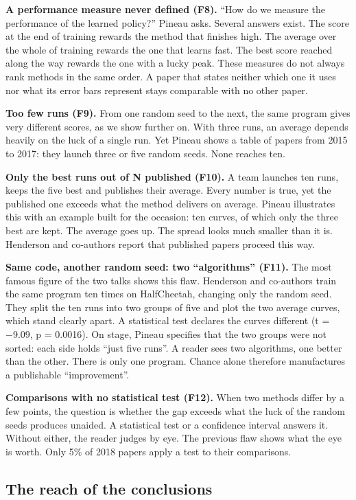 \documentclass[11pt,a4paper]{article}
\begin{document}
\textbf{A performance measure never defined (F8).} ``How do we measure
the performance of the learned policy?'' Pineau asks. Several answers
exist. The score at the end of training rewards the method that finishes
high. The average over the whole of training rewards the one that learns
fast. The best score reached along the way rewards the one with a lucky
peak. These measures do not always rank methods in the same order. A
paper that states neither which one it uses nor what its error bars
represent stays comparable with no other paper.

\textbf{Too few runs (F9).} From one random seed to the next, the same
program gives very different scores, as we show further on. With three
runs, an average depends heavily on the luck of a single run. Yet Pineau
shows a table of papers from 2015 to 2017: they launch three or five
random seeds. None reaches ten.

\textbf{Only the best runs out of N published (F10).} A team launches
ten runs, keeps the five best and publishes their average. Every number
is true, yet the published one exceeds what the method delivers on
average. Pineau illustrates this with an example built for the occasion:
ten curves, of which only the three best are kept. The average goes up.
The spread looks much smaller than it is. Henderson and co-authors
report that published papers proceed this way.

\textbf{Same code, another random seed: two ``algorithms'' (F11).} The
most famous figure of the two talks shows this flaw. Henderson and
co-authors train the same program ten times on HalfCheetah, changing
only the random seed. They split the ten runs into two groups of five
and plot the two average curves, which stand clearly apart. A
statistical test declares the curves different (t = −9.09, p = 0.0016).
On stage, Pineau specifies that the two groups were not sorted: each
side holds ``just five runs''. A reader sees two algorithms, one better
than the other. There is only one program. Chance alone therefore
manufactures a publishable ``improvement''.

\textbf{Comparisons with no statistical test (F12).} When two methods
differ by a few points, the question is whether the gap exceeds what the
luck of the random seeds produces unaided. A statistical test or a
confidence interval answers it. Without either, the reader judges by
eye. The previous flaw shows what the eye is worth. Only 5\% of 2018
papers apply a test to their comparisons.

\subsection{The reach of the
conclusions}\label{the-reach-of-the-conclusions}
\end{document}
